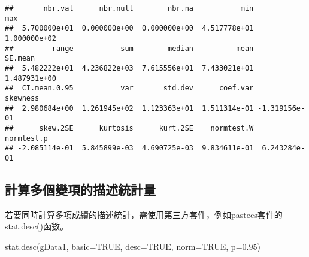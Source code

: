 \documentclass[
]{book}
\newenvironment{Shaded}{\begin{snugshade}}{\end{snugshade}}
\newcommand{\AttributeTok}[1]{\textcolor[rgb]{0.77,0.63,0.00}{#1}}
\newcommand{\ConstantTok}[1]{\textcolor[rgb]{0.00,0.00,0.00}{#1}}
\newcommand{\FloatTok}[1]{\textcolor[rgb]{0.00,0.00,0.81}{#1}}
\newcommand{\FunctionTok}[1]{\textcolor[rgb]{0.00,0.00,0.00}{#1}}
\newcommand{\NormalTok}[1]{#1}
\begin{document}
\begin{verbatim}
##       nbr.val      nbr.null        nbr.na           min           max 
##  5.700000e+01  0.000000e+00  0.000000e+00  4.517778e+01  1.000000e+02 
##         range           sum        median          mean       SE.mean 
##  5.482222e+01  4.236822e+03  7.615556e+01  7.433021e+01  1.487931e+00 
##  CI.mean.0.95           var       std.dev      coef.var      skewness 
##  2.980684e+00  1.261945e+02  1.123363e+01  1.511314e-01 -1.319156e-01 
##      skew.2SE      kurtosis      kurt.2SE    normtest.W    normtest.p 
## -2.085114e-01  5.845899e-03  4.690725e-03  9.834611e-01  6.243284e-01
\end{verbatim}

\hypertarget{ux8a08ux7b97ux591aux500bux8b8aux9805ux7684ux63cfux8ff0ux7d71ux8a08ux91cf}{%
\subsection{計算多個變項的描述統計量}\label{ux8a08ux7b97ux591aux500bux8b8aux9805ux7684ux63cfux8ff0ux7d71ux8a08ux91cf}}

若要同時計算多項成績的描述統計，需使用第三方套件，例如pastecs套件的stat.desc()函數。

\begin{Shaded}
\begin{Highlighting}[]
\FunctionTok{stat.desc}\NormalTok{(gData1, }\AttributeTok{basic=}\ConstantTok{TRUE}\NormalTok{, }\AttributeTok{desc=}\ConstantTok{TRUE}\NormalTok{, }\AttributeTok{norm=}\ConstantTok{TRUE}\NormalTok{, }\AttributeTok{p=}\FloatTok{0.95}\NormalTok{)}
\end{Highlighting}
\end{Shaded}
\end{document}
